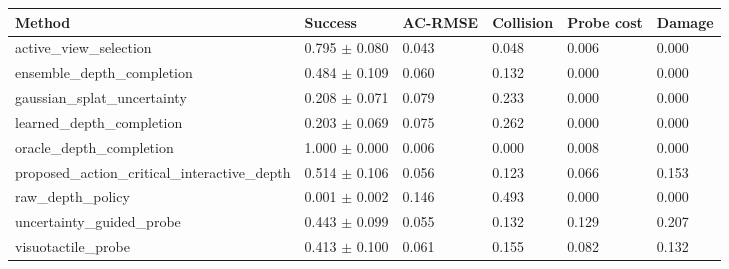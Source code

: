 \begin{tabular}{llllll}
\toprule
Method & Success & AC-RMSE & Collision & Probe cost & Damage \\
\midrule
active\_view\_selection & 0.795 $\pm$ 0.080 & 0.043 & 0.048 & 0.006 & 0.000 \\
ensemble\_depth\_completion & 0.484 $\pm$ 0.109 & 0.060 & 0.132 & 0.000 & 0.000 \\
gaussian\_splat\_uncertainty & 0.208 $\pm$ 0.071 & 0.079 & 0.233 & 0.000 & 0.000 \\
learned\_depth\_completion & 0.203 $\pm$ 0.069 & 0.075 & 0.262 & 0.000 & 0.000 \\
oracle\_depth\_completion & 1.000 $\pm$ 0.000 & 0.006 & 0.000 & 0.008 & 0.000 \\
proposed\_action\_critical\_interactive\_depth & 0.514 $\pm$ 0.106 & 0.056 & 0.123 & 0.066 & 0.153 \\
raw\_depth\_policy & 0.001 $\pm$ 0.002 & 0.146 & 0.493 & 0.000 & 0.000 \\
uncertainty\_guided\_probe & 0.443 $\pm$ 0.099 & 0.055 & 0.132 & 0.129 & 0.207 \\
visuotactile\_probe & 0.413 $\pm$ 0.100 & 0.061 & 0.155 & 0.082 & 0.132 \\
\bottomrule
\end{tabular}

